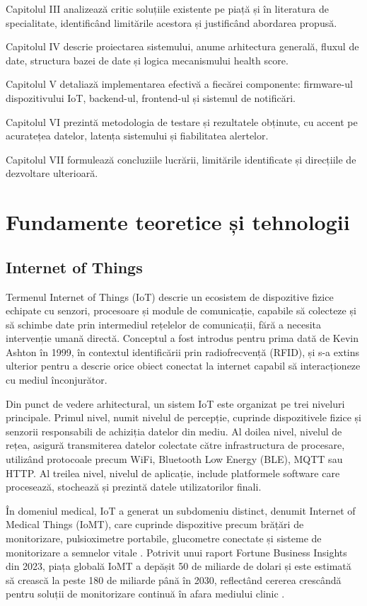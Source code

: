\documentclass[12pt,a4paper,twoside]{article}
\begin{document}
Capitolul III analizează critic soluțiile existente pe piață și în literatura de specialitate, identificând limitările acestora și justificând abordarea propusă.

Capitolul IV descrie proiectarea sistemului, anume arhitectura generală, fluxul de date, structura bazei de date și logica mecanismului health score.

Capitolul V detaliază implementarea efectivă a fiecărei componente: firmware-ul dispozitivului IoT, backend-ul, frontend-ul și sistemul de notificări.

Capitolul VI prezintă metodologia de testare și rezultatele obținute, cu accent pe acuratețea datelor, latența sistemului și fiabilitatea alertelor.

Capitolul VII formulează concluziile lucrării, limitările identificate și direcțiile de dezvoltare ulterioară.

\newpage
\section{Fundamente teoretice și tehnologii}

\subsection{Internet of Things}

Termenul Internet of Things (IoT) descrie un ecosistem de dispozitive fizice echipate cu senzori, procesoare și module de comunicație, capabile să colecteze și să schimbe date prin intermediul rețelelor de comunicații, fără a necesita intervenție umană directă. Conceptul a fost introdus pentru prima dată de Kevin Ashton în 1999, în contextul identificării prin radiofrecvență (RFID), și s-a extins ulterior pentru a descrie orice obiect conectat la internet capabil să interacționeze cu mediul înconjurător.

Din punct de vedere arhitectural, un sistem IoT este organizat pe trei niveluri principale. Primul nivel, numit nivelul de percepție, cuprinde dispozitivele fizice și senzorii responsabili de achiziția datelor din mediu. Al doilea nivel, nivelul de rețea, asigură transmiterea datelor colectate către infrastructura de procesare, utilizând protocoale precum WiFi, Bluetooth Low Energy (BLE), MQTT sau HTTP. Al treilea nivel, nivelul de aplicație, include platformele software care procesează, stochează și prezintă datele utilizatorilor finali.

În domeniul medical, IoT a generat un subdomeniu distinct, denumit Internet of Medical Things (IoMT), care cuprinde dispozitive precum brățări de monitorizare, pulsioximetre portabile, glucometre conectate și sisteme de monitorizare a semnelor vitale \cite{bandaru2025, pabitha2025}. Potrivit unui raport Fortune Business Insights din 2023, piața globală IoMT a depășit 50 de miliarde de dolari și este estimată să crească la peste 180 de miliarde până în 2030, reflectând cererea crescândă pentru soluții de monitorizare continuă în afara mediului clinic \cite{panahi2025ejiss}.
\end{document}
